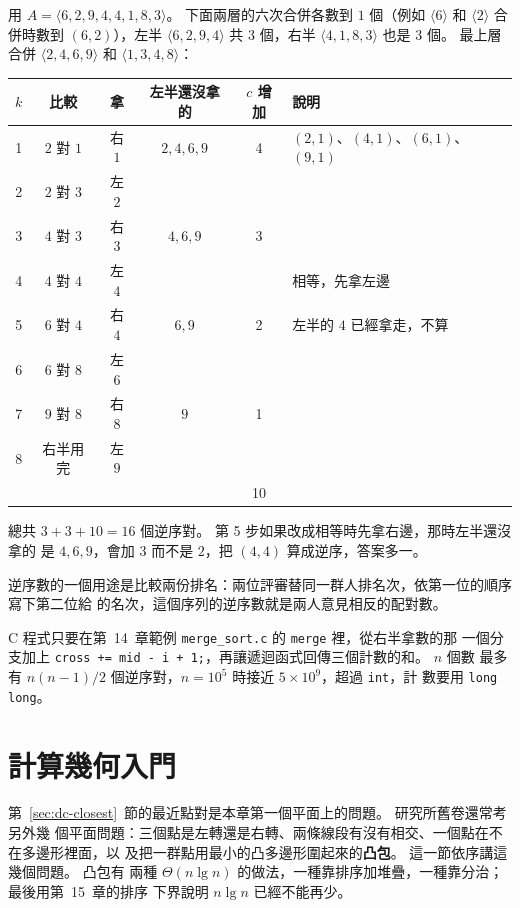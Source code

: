 用 $A = \langle 6, 2, 9, 4, 4, 1, 8, 3 \rangle$。 下面兩層的六次合併各數到 $1$ 個（例如
$\langle 6 \rangle$ 和 $\langle 2 \rangle$ 合併時數到 $(6, 2)$），左半
$\langle 6, 2, 9, 4 \rangle$ 共 $3$ 個，右半 $\langle 4, 1, 8, 3 \rangle$ 也是
$3$ 個。 最上層合併 $\langle 2, 4, 6, 9 \rangle$ 和 $\langle 1, 3, 4, 8 \rangle$：

\begin{center}
\begin{tabular}{cccccl}
\toprule
$k$ & 比較 & 拿 & 左半還沒拿的 & $c$ 增加 & 說明 \\
\midrule
1 & $2$ 對 $1$ & 右 $1$ & $2, 4, 6, 9$ & 4 & $(2,1)$、$(4,1)$、$(6,1)$、$(9,1)$ \\
2 & $2$ 對 $3$ & 左 $2$ & & & \\
3 & $4$ 對 $3$ & 右 $3$ & $4, 6, 9$ & 3 & \\
4 & $4$ 對 $4$ & 左 $4$ & & & 相等，先拿左邊 \\
5 & $6$ 對 $4$ & 右 $4$ & $6, 9$ & 2 & 左半的 $4$ 已經拿走，不算 \\
6 & $6$ 對 $8$ & 左 $6$ & & & \\
7 & $9$ 對 $8$ & 右 $8$ & $9$ & 1 & \\
8 & 右半用完 & 左 $9$ & & & \\
\midrule
& & & & 10 & \\
\bottomrule
\end{tabular}
\end{center}

總共 $3 + 3 + 10 = 16$ 個逆序對。 第 5 步如果改成相等時先拿右邊，那時左半還沒拿的
是 $4, 6, 9$，會加 $3$ 而不是 $2$，把 $(4, 4)$ 算成逆序，答案多一。

逆序數的一個用途是比較兩份排名：兩位評審替同一群人排名次，依第一位的順序寫下第二位給
的名次，這個序列的逆序數就是兩人意見相反的配對數。

C 程式只要在第~14~章範例 \texttt{merge\_sort.c} 的 \texttt{merge} 裡，從右半拿數的那
一個分支加上 \texttt{cross += mid - i + 1;}，再讓遞迴函式回傳三個計數的和。 $n$ 個數
最多有 $n(n-1)/2$ 個逆序對，$n = 10^5$ 時接近 $5 \times 10^9$，超過 \texttt{int}，計
數要用 \texttt{long long}。


\section{計算幾何入門}
\label{sec:dc-geom}

第~\ref{sec:dc-closest}~節的最近點對是本章第一個平面上的問題。 研究所舊卷還常考另外幾
個平面問題：三個點是左轉還是右轉、兩條線段有沒有相交、一個點在不在多邊形裡面，以
及把一群點用最小的凸多邊形圍起來的\textbf{凸包}。 這一節依序講這幾個問題。 凸包有
兩種 $\Theta(n \lg n)$ 的做法，一種靠排序加堆疊，一種靠分治；最後用第~15~章的排序
下界說明 $n \lg n$ 已經不能再少。

